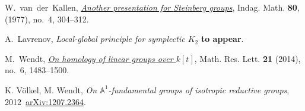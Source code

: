 \documentclass[oneside,12pt]{amsart}
\numberwithin{equation}{section}
\numberwithin{lem}{section}
\theoremstyle{definition}
\theoremstyle{remark}
\newcommand{\Aff}{\mathbb{A}}
\begin{document}
{\begin{thebibliography}{MMMM}
W.~van~der~Kallen, \emph{\href{http://dx.doi.org/10.1016/1385-7258(77)90026-9}{Another presentation for {S}teinberg groups}},
Indag. Math. {\bf 80}, (1977), no.~4, 304--312.

A.~Lavrenov, \emph{Local-global principle for symplectic $K_2$}
{\bf to appear}.

M.~Wendt, \emph{\href{https://dx.doi.org/10.4310/MRL.2014.v21.n6.a15}{On homology of linear groups over {$k[t]$}}},
Math. Res. Lett. \textbf{21} (2014), no.~6, 1483--1500.

 K. V\"olkel, M. Wendt,
\emph{On $\Aff^1$-fundamental groups of isotropic reductive groups},
2012~\href{http://arxiv.org/abs/1207.2364}{arXiv:1207.2364}.
\end{thebibliography}

} %
\end{document}
